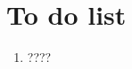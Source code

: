 \documentclass[11pt,a4paper,oneside]{article}
\begin{document}
\section*{To do list}

\begin{enumerate}
    \item ????
\end{enumerate}
\end{document}

